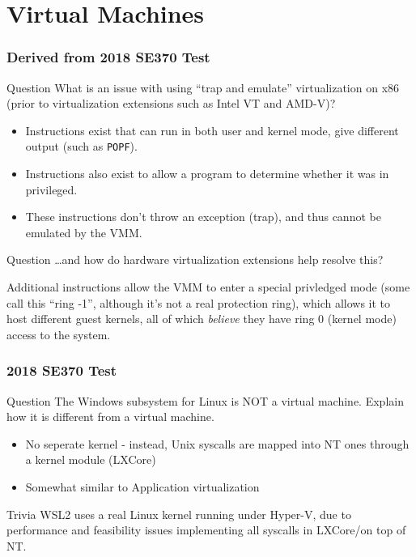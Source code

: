 \documentclass{beamer}
\begin{document}
\section{Virtual Machines}
\begin{frame}
  \frametitle{Derived from 2018 SE370 Test}
  \begin{block}{Question}
    What is an issue with using ``trap and emulate'' virtualization on x86 (prior to virtualization extensions such as Intel VT and AMD-V)?
  \end{block}
  \pause
  \begin{itemize}
    \item Instructions exist that can run in both user and kernel mode, give different output (such as \texttt{POPF}).
    \item Instructions also exist to allow a program to determine whether it was in privileged.
    \item These instructions don't throw an exception (trap), and thus cannot be emulated by the VMM.
  \end{itemize}
\end{frame}
\begin{frame}
  \begin{block}{Question}
    \dots and how do hardware virtualization extensions help resolve this?
  \end{block}
  \pause
  Additional instructions allow the VMM to enter a special privledged mode (some call this ``ring -1'', although it's not a real protection ring), which allows it to host different guest kernels, all of which \emph{believe} they have ring 0 (kernel mode) access to the system.
\end{frame}
\begin{frame}
  \frametitle{2018 SE370 Test}
  \begin{block}{Question}
    The Windows subsystem for Linux is NOT a virtual machine. Explain how it is different from a virtual machine.
  \end{block}
  \pause
  \begin{itemize}
    \item No seperate kernel - instead, Unix syscalls are mapped into NT ones through a kernel module (LXCore)
    \item Somewhat similar to Application virtualization
  \end{itemize}
  \begin{exampleblock}{Trivia}
    WSL2 uses a real Linux kernel running under Hyper-V, due to performance and feasibility issues implementing all syscalls in LXCore/on top of NT.
  \end{exampleblock}
\end{frame}
\end{document}
